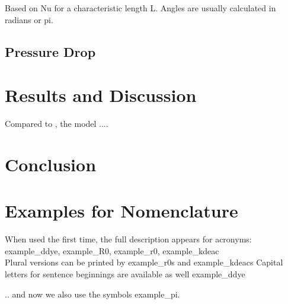 \documentclass[11pt]{article} %
\begin{document}
Based on \gls{Nu} for a characteristic length \gls{L}. Angles are usually calculated in radians or \gls{pi}.

\subsection{Pressure Drop}

\section{Results and Discussion}

Compared to \cite{Kaern2011b}, the model .... 


\cite{Zhang2006}

\cite{Zhang2009}

\section{Conclusion}




\section{Examples for Nomenclature}
When used the first time, the full description appears for acronyms: \gls{example_ddye}, \gls{example_R0}, \gls{example_r0}, \gls{example_kdeac}\\

Plural versions can be printed by \glspl{example_r0} and \glspl{example_kdeac}
Capital letters for sentence beginnings are available as well \Gls{example_ddye}

.. and now we also use the symbols \gls{example_pi}.

\printglossary[type=main]
\printglossary[type=acronym]
\printglossary[type=dimlessnumber]
\printglossary[type=greeksymbols]
\printglossary[type=subscripts]

\end{document}
